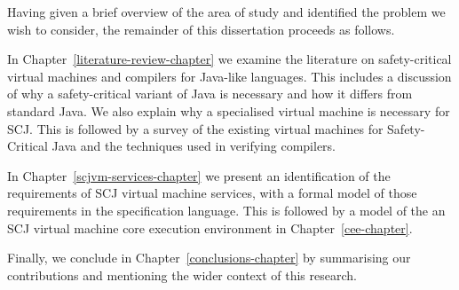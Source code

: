 Having given a brief overview of the area of study and identified the
problem we wish to consider, the remainder of this dissertation
proceeds as follows.

In Chapter~\ref{literature-review-chapter} we examine the literature
on safety-critical virtual machines and compilers for Java-like
languages.
This includes a discussion of why a safety-critical variant of Java is
necessary and how it differs from standard Java.
We also explain why a specialised virtual machine is necessary for
SCJ.
This is followed by a survey of the existing virtual machines for
Safety-Critical Java and the techniques used in verifying compilers.

In Chapter~\ref{scjvm-services-chapter} we present an identification of the
requirements of SCJ virtual machine services, with a formal model of
those requirements in the \Circus{} specification language.
This is followed by a model of the an SCJ virtual machine core
execution environment in Chapter~\ref{cee-chapter}.

Finally, we conclude in Chapter~\ref{conclusions-chapter} by
summarising our contributions and mentioning the wider context of this
research.